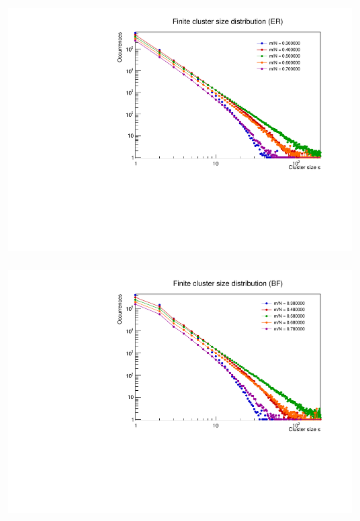 \begin{figure}
	\centering
	\begin{subfigure}[b]{0.48\linewidth}
		\includegraphics[width=\linewidth]{images/ClusterDistrER.pdf}
	\end{subfigure}
	\hspace{0.5em}
	\begin{subfigure}[b]{0.48\linewidth}
		\includegraphics[width=\linewidth]{images/ClusterDistrBF.pdf}
	\end{subfigure}
	
	\vspace{0.5em} %
	

\end{figure}
